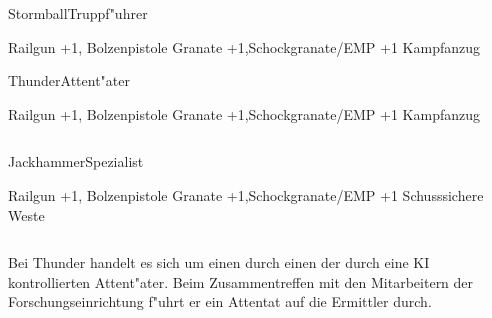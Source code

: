 \begin{column}[l]{0.45}
    \begin{nscsheet}[h]{Stormball\newline{}Truppf"uhrer}
        \nscstats[ATT=3,AGG=3,CON=2]
        \nscruler
        \begin{nscinventory}
            \nscitem[Waffen] Railgun +1, Bolzenpistole
            \nscitem[Granaten] Granate +1,\newline{}Schockgranate/EMP +1
            \nscitem[R"ustung] Kampfanzug
        \end{nscinventory}
    \end{nscsheet}

    \begin{nscsheet}[h]{Thunder\newline{}Attent"ater}
        \nscstats[ATT=3,AGG=3,CON=2]
        \nscruler
        \begin{nscinventory}
            \nscitem[Waffen] Railgun +1, Bolzenpistole
            \nscitem[Granaten] Granate +1,\newline{}Schockgranate/EMP +1
            \nscitem[R"ustung] Kampfanzug
        \end{nscinventory}
    \end{nscsheet}
\end{column}
\begin{column}[r]{0.45}
    \begin{nscsheet}[h]{Jackhammer\newline{}Spezialist}
        \nscstats[ATT=2,AGG=2,DEX=3,CON=2]
        \nscruler
        \begin{nscinventory}
            \nscitem[Waffen] Railgun +1, Bolzenpistole
            \nscitem[Granaten] Granate +1,\newline{}Schockgranate/EMP +1
            \nscitem[R"ustung] Schusssichere Weste
        \end{nscinventory}
    \end{nscsheet}
\end{column}

\medskip
Bei Thunder handelt es sich um einen durch einen der durch eine KI kontrollierten Attent"ater. Beim Zusammentreffen mit den 
Mitarbeitern der Forschungseinrichtung f"uhrt er ein Attentat auf die Ermittler durch.
